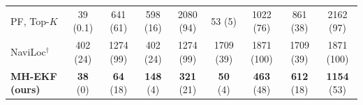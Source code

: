 \begin{table}[t]
\begin{tabular}{lcccccccc}
PF, Top-$K$ & 39 (0.1) & 641 (61) & 598 (16) & 2080 (94) & 53 (5) & 1022 (76) & 861 (38) & 2162 (97) \\
NaviLoc$^\dagger$ \cite{shpagin2026naviloc} & 402 (24) & 1274 (99) & 402 (24) & 1274 (99) & 1709 (39) & 1871 (100) & 1709 (39) & 1871 (100) \\
\textbf{MH-EKF (ours)} & \textbf{38} (0) & \textbf{64} (18) & \textbf{148} (4) & \textbf{321} (21) & \textbf{50} (4) & \textbf{463} (48) & \textbf{612} (18) & \textbf{1154} (53) \\
\bottomrule
\end{tabular}
\end{table}
